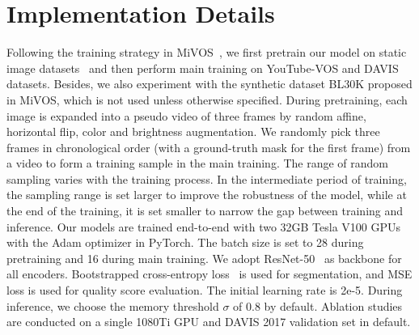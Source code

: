 \documentclass[runningheads]{llncs}
\begin{document}
\section{Implementation Details}
Following the training strategy in MiVOS~\cite{mivos}, we first pretrain our model on static image datasets~\cite{static1,static2,static3,static4,static5} and then perform main training on YouTube-VOS and DAVIS datasets. Besides, we also experiment with the synthetic dataset BL30K proposed in MiVOS, which is not used unless otherwise specified. 
    During pretraining, each image is expanded into a pseudo video of three frames by random affine, horizontal flip, color and brightness augmentation. 
    We randomly pick three frames in chronological order (with a ground-truth mask for the first frame) from a video to form a training sample in the main training.
    The range of random sampling varies with the training process.
    In the intermediate period of training, the sampling range is set larger to improve the robustness of the model, while at the end of the training, it is set smaller to narrow the gap between training and inference.
Our models are trained end-to-end with two 32GB Tesla V100 GPUs with the Adam optimizer in PyTorch. The batch size is set to 28 during pretraining and 16 during main training.
    We adopt ResNet-50~\cite{resnet} as backbone for all encoders. Bootstrapped cross-entropy loss~\cite{mivos} is used for segmentation, and MSE loss is used for quality score evaluation. 
    The initial learning rate is 2e-5.
    During inference, we choose the memory threshold $\sigma$ of 0.8 by default. 
    Ablation studies are conducted on a single 1080Ti GPU and DAVIS 2017 validation set in default.
    
%
\end{document}
